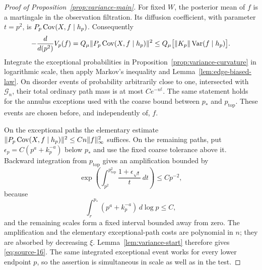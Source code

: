 \begin{proof}[Proof of Proposition~\ref{prop:variance-main}]
For fixed $W$, the posterior mean of $f$ is a martingale in the
observation filtration. Its diffusion coefficient, with parameter
$t=p^2$, is $P_p\operatorname{Cov}(X,f\mid h_p)$. Consequently
\[
 -\frac{d}{d(p^2)}V_p(f)
 =Q_\mu\|P_p\operatorname{Cov}(X,f\mid h_p)\|^2
 \le Q_\mu\bigl[\|K_p\|\operatorname{Var}(f\mid h_p)\bigr].
\]
Integrate the exceptional probabilities in
Proposition~\ref{prop:variance-curvature} in logarithmic scale, then apply
Markov's inequality and Lemma~\ref{lem:edge-biased-law}. On disorder
events of probability arbitrarily close to one, intersected with
$\mathcal G_n$, their total ordinary path mass is at most
$Ce^{-n^\xi}$. The same statement holds for the annulus exceptions
used with the coarse bound between $p_*$ and $p_{\mathrm{top}}$.
These events are chosen before, and independently of, $f$.

On the exceptional paths the elementary estimate
$\|P_p\operatorname{Cov}(X,f\mid h_p)\|^2\le Cn\|f\|_\infty^2$ suffices.
On the remaining paths, put $\epsilon_p=C(p^a+k_p^{-a})$ below $p_*$
and use the fixed coarse tolerance above it. Backward integration from
$p_{\mathrm{top}}$ gives an amplification bounded by
\[
 \exp\left(\int_{p^2}^{p_{\mathrm{top}}^2}
                  \frac{1+\epsilon_{\sqrt t}}{t}\,dt\right)
 \le Cp^{-2},
\]
because
\[
 \int_r^{p_*}(p^a+k_p^{-a})\,d\log p\le C,
\]
and the remaining scales form a fixed interval bounded away from zero.
The amplification and the elementary exceptional-path costs are
polynomial in $n$; they are absorbed by decreasing $\xi$.
Lemma~\ref{lem:variance-start} therefore gives
\eqref{eq:source-16}. The same integrated exceptional event works for
every lower endpoint $p$, so the assertion is simultaneous in scale as
well as in the test.
\end{proof}

